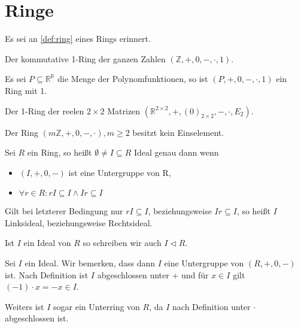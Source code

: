 

\section{Ringe}

Es sei an \cref{def:ring} eines Rings erinnert.

\begin{example}
    Der kommutative 1-Ring der ganzen Zahlen $(\mathbb{Z}, +, 0, -, \cdot, 1)$.
\end{example}

\begin{example}
    Es sei $P \subseteq \mathbb{R}^{\mathbb{R}}$ die Menge der Polynomfunktionen, so ist $(P, +, 0, -, \cdot, 1)$ ein Ring mit 1.
\end{example}

\begin{example}
    Der 1-Ring der reelen $2 \times 2$ Matrizen $(\mathbb{R}^{2 \times 2}, +, (0)_{2 \times 2}, -, \cdot, E_2)$.
\end{example}

\begin{example}
    Der Ring $(m\mathbb{Z}, +, 0, -, \cdot), m \geq 2$ besitzt kein Einselement.
\end{example}

\begin{definition}
    Sei $R$ ein Ring, so heißt $\emptyset \neq I \subseteq R$ Ideal genau dann wenn
    \begin{itemize}
        \item $(I, +, 0, -)$ ist eine Untergruppe von R,
        \item $\forall r \in R: rI \subseteq I \land Ir \subseteq I$
    \end{itemize}
    Gilt bei letzterer Bedingung nur $rI \subseteq I$, beziehungsweise $Ir \subseteq I$, so heißt $I$ Linksideal, beziehungsweise Rechtsideal.

    Ist $I$ ein Ideal von $R$ so schreiben wir auch $I \vartriangleleft R$.
\end{definition}

\begin{remark}
    Sei $I$ ein Ideal. Wir bemerken, dass dann $I$ eine Untergruppe von $(R, +, 0, -)$ ist. Nach Definition ist $I$ abgeschlossen unter $+$ und für $x \in I$ gilt $(-1) \cdot x = -x \in I$.

    Weiters ist $I$ sogar ein Unterring von $R$, da $I$ nach Definition unter $\cdot$ abgeschlossen ist.
\end{remark}


